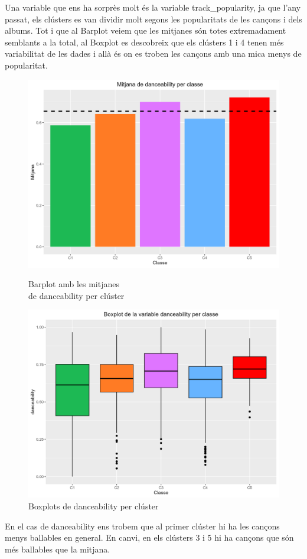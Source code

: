 \documentclass{article}
\begin{document}
Una variable que ens ha sorprès molt és la variable track\_popularity, ja que l'any passat, els clústers es van dividir molt segons les popularitats de les cançons i dels albums. Tot i que al Barplot veiem que les mitjanes són totes extremadament semblants a la total, al Boxplot es descobreix que els clústers 1 i 4 tenen més variabilitat de les dades i allà és on es troben les cançons amb una mica menys de popularitat. 

\begin{figure}[H]
\centering
    \begin{minipage}{.49\textwidth}
        \centering
        \includegraphics[width=0.95\linewidth]{Images/5_Profiling/numeriques/Num_BarPlot_danceability.png}
        \caption{Barplot amb les mitjanes \\ de danceability per clúster}
        \label{fig:Num_BarPlot_streams}
    \end{minipage}%
    \begin{minipage}{.49\textwidth}
        \centering
        \includegraphics[width=0.95\linewidth]{Images/5_Profiling/numeriques/Num_BoxPlot_danceability.png}
        \caption{Boxplots de danceability per clúster}
        \label{fig:Num_BoxPlot_streams}
    \end{minipage}%
\end{figure}
En el cas de danceability ens trobem que al primer clúster hi ha les cançons menys ballables en general. En canvi, en els clústers 3 i 5 hi ha cançons que són més ballables que la mitjana. 
\end{document}
